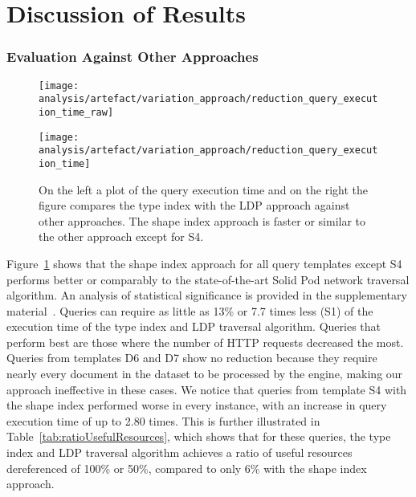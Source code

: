 \section{Discussion of Results}\label{sec:result}

\subsubsection{Evaluation Against Other Approaches}

\begin{figure}
    \centering
    \begin{minipage}[t]{0.40\linewidth}
        \centering
        \texttt{[image: analysis/artefact/variation\_approach/reduction\_query\_execution\_time\_raw]}
    \end{minipage}
    \hspace{0.05\textwidth}
    \begin{minipage}[t]{0.40\linewidth}
        \centering
        \texttt{[image: analysis/artefact/variation\_approach/reduction\_query\_execution\_time]}
    \end{minipage}

    \caption{
        On the left a plot of the query execution time and on the right the figure compares the type index with the LDP approach against other approaches.
        The shape index approach is faster or similar to the other approach except for S4.
        }
    \label{fig:compApproach}
\end{figure}

%


Figure~\ref{fig:compApproach} shows that the shape index approach for all query templates except S4 performs better or comparably to the state-of-the-art Solid Pod network traversal algorithm.
An analysis of statistical significance is provided in the supplementary material~\hyperref[sf:complementaryMaterial]{}.
Queries can require as little as 13\% or 7.7 times less (S1) of the execution time of the type index and LDP traversal algorithm.
Queries that perform best are those where the number of HTTP requests decreased the most.
Queries from templates D6 and D7 show no reduction because they require nearly every document in the dataset to be processed by the engine, making our approach ineffective in these cases.
We notice that queries from template S4 with the shape index performed worse in every instance, with an increase in query execution time of up to 2.80 times.
This is further illustrated in Table~\ref{tab:ratioUsefulResources}, which shows that for these queries, the type index and LDP traversal algorithm achieves a ratio of useful resources dereferenced of 100\% or 50\%, compared to only 6\% with the shape index approach.

